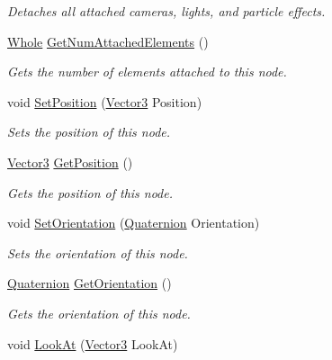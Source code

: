 \begin{DoxyCompactItemize}
\begin{DoxyCompactList}\small\item\em Detaches all attached cameras, lights, and particle effects. \item\end{DoxyCompactList}\item 
\hyperlink{namespacephys_a460f6bc24c8dd347b05e0366ae34f34a}{Whole} \hyperlink{classphys_1_1WorldNode_a57cf111ca5ef3ccc75bd9c5fef77ae00}{GetNumAttachedElements} ()
\begin{DoxyCompactList}\small\item\em Gets the number of elements attached to this node. \item\end{DoxyCompactList}\item 
void \hyperlink{classphys_1_1WorldNode_ab15c80e2afc78640c4382b88474b02c5}{SetPosition} (\hyperlink{classphys_1_1Vector3}{Vector3} Position)
\begin{DoxyCompactList}\small\item\em Sets the position of this node. \item\end{DoxyCompactList}\item 
\hyperlink{classphys_1_1Vector3}{Vector3} \hyperlink{classphys_1_1WorldNode_a4edb1d8bec8b23a1962579d5012793f9}{GetPosition} ()
\begin{DoxyCompactList}\small\item\em Gets the position of this node. \item\end{DoxyCompactList}\item 
void \hyperlink{classphys_1_1WorldNode_a583cbdca344ac23894ef469c7b7f6062}{SetOrientation} (\hyperlink{classphys_1_1Quaternion}{Quaternion} Orientation)
\begin{DoxyCompactList}\small\item\em Sets the orientation of this node. \item\end{DoxyCompactList}\item 
\hyperlink{classphys_1_1Quaternion}{Quaternion} \hyperlink{classphys_1_1WorldNode_ad99c661777321343f4b9ee220a678315}{GetOrientation} ()
\begin{DoxyCompactList}\small\item\em Gets the orientation of this node. \item\end{DoxyCompactList}\item 
void \hyperlink{classphys_1_1WorldNode_aa0373976b11af2171188d2ee8c114420}{LookAt} (\hyperlink{classphys_1_1Vector3}{Vector3} LookAt)

\end{DoxyCompactItemize}
